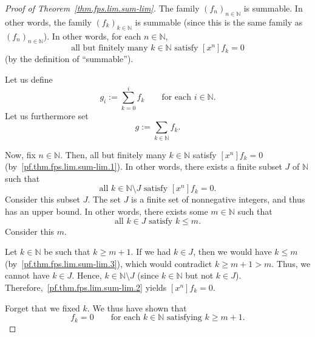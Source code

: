\begin{proof}[Proof of Theorem~\ref{thm.fps.lim.sum-lim}]
\leanok
The family $(f_n)_{n\in\mathbb{N}}$ is summable. In other words,
the family $(f_k)_{k\in\mathbb{N}}$ is summable (since this is the same
family as $(f_n)_{n\in\mathbb{N}}$). In other words, for each
$n\in\mathbb{N}$,
\begin{equation}
\text{all but finitely many } k\in\mathbb{N} \text{ satisfy }
[x^n] f_k = 0
\label{pf.thm.fps.lim.sum-lim.1}
\end{equation}
(by the definition of ``summable'').

Let us define
\begin{equation}
g_i := \sum_{k=0}^{i} f_k
\qquad\text{for each } i\in\mathbb{N}.
\label{pf.thm.fps.lim.sum-lim.gi}
\end{equation}
Let us furthermore set
\begin{equation}
g := \sum_{k\in\mathbb{N}} f_k.
\label{pf.thm.fps.lim.sum-lim.g}
\end{equation}

Now, fix $n\in\mathbb{N}$. Then, all but finitely many
$k\in\mathbb{N}$ satisfy $[x^n] f_k = 0$
(by~\eqref{pf.thm.fps.lim.sum-lim.1}). In other words, there exists a
finite subset $J$ of $\mathbb{N}$ such that
\begin{equation}
\text{all } k\in\mathbb{N}\setminus J \text{ satisfy } [x^n] f_k = 0.
\label{pf.thm.fps.lim.sum-lim.2}
\end{equation}
Consider this subset $J$. The set $J$ is a finite set of nonnegative
integers, and thus has an upper bound. In other words, there exists some
$m\in\mathbb{N}$ such that
\begin{equation}
\text{all } k\in J \text{ satisfy } k\leq m.
\label{pf.thm.fps.lim.sum-lim.3}
\end{equation}
Consider this $m$.

Let $k\in\mathbb{N}$ be such that $k\geq m+1$. If we had $k\in J$,
then we would have $k\leq m$
(by~\eqref{pf.thm.fps.lim.sum-lim.3}), which would contradict
$k\geq m+1 > m$. Thus, we cannot have $k\in J$. Hence,
$k\in\mathbb{N}\setminus J$ (since $k\in\mathbb{N}$ but not
$k\in J$). Therefore,~\eqref{pf.thm.fps.lim.sum-lim.2} yields
$[x^n] f_k = 0$.

Forget that we fixed $k$. We thus have shown that
\begin{equation}
[x^n] f_k = 0 \qquad\text{for each } k\in\mathbb{N} \text{ satisfying }
k\geq m+1.
\label{pf.thm.fps.lim.sum-lim.4}
\end{equation}


\end{proof}
